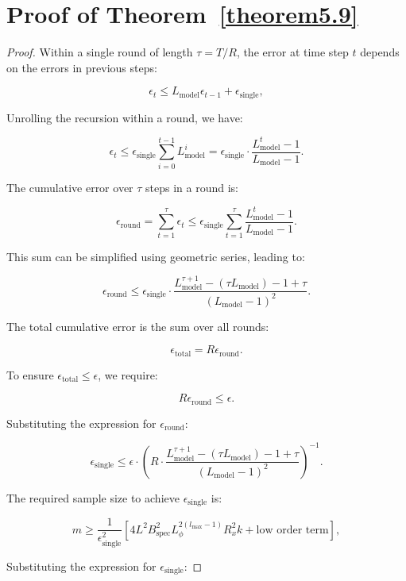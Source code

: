 \section{Proof of Theorem~\ref{theorem5.9}}\label{appendix:theorem5.9}

\begin{proof}
Within a single round of length \( \tau = T/R \), the error at time step \( t \) depends on the errors in previous steps:

\[
\epsilon_t \leq L_{\text{model}} \epsilon_{t-1} + \epsilon_{\text{single}},
\]



Unrolling the recursion within a round, we have:

\[
\epsilon_t \leq \epsilon_{\text{single}} \sum_{i=0}^{t-1} L_{\text{model}}^i = \epsilon_{\text{single}} \cdot \frac{L_{\text{model}}^{t} - 1}{L_{\text{model}} - 1}.
\]

The cumulative error over \( \tau \) steps in a round is:

\[
\epsilon_{\text{round}} = \sum_{t=1}^{\tau} \epsilon_t \leq \epsilon_{\text{single}} \sum_{t=1}^{\tau} \frac{L_{\text{model}}^{t} - 1}{L_{\text{model}} - 1}.
\]

This sum can be simplified using geometric series, leading to:

\[
\epsilon_{\text{round}} \leq \epsilon_{\text{single}} \cdot \frac{L_{\text{model}}^{\tau+1} - (\tau L_{\text{model}}) - 1 + \tau}{(L_{\text{model}} - 1)^2}.
\]


The total cumulative error is the sum over all rounds:

\[
\epsilon_{\text{total}} = R \epsilon_{\text{round}}.
\]

To ensure \( \epsilon_{\text{total}} \leq \epsilon \), we require:

\[
R \epsilon_{\text{round}} \leq \epsilon.
\]

Substituting the expression for \( \epsilon_{\text{round}} \):

\[
\epsilon_{\text{single}} \leq \epsilon \cdot \left( R \cdot \frac{L_{\text{model}}^{\tau+1} - (\tau L_{\text{model}}) - 1 + \tau}{(L_{\text{model}} - 1)^2} \right)^{-1}.
\]

The required sample size to achieve \( \epsilon_{\text{single}} \) is:

\[
m \geq \frac{1}{\epsilon_{\text{single}}^2} \left[ 4 L^2 B_{\text{spec}}^2 L_{\phi}^{2(l_{\text{max}}-1)} R_x^2 k + \text{low order term} \right],
\]


Substituting the expression for \( \epsilon_{\text{single}} \):


\end{proof}
